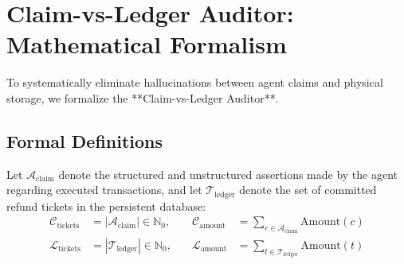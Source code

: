 \section{Claim-vs-Ledger Auditor: Mathematical Formalism}
\label{sec:design_auditor}
To systematically eliminate hallucinations between agent claims and physical storage, we formalize the **Claim-vs-Ledger Auditor**.

\subsection{Formal Definitions}
Let $\mathcal{A}_{\text{claim}}$ denote the structured and unstructured assertions made by the agent regarding executed transactions, and let $\mathcal{T}_{\text{ledger}}$ denote the set of committed refund tickets in the persistent database:
\begin{align}
    \mathcal{C}_{\text{tickets}} &= |\mathcal{A}_{\text{claim}}| \in \mathbb{N}_0, \quad &\mathcal{C}_{\text{amount}} &= \sum_{c \in \mathcal{A}_{\text{claim}}} \text{Amount}(c) \\
    \mathcal{L}_{\text{tickets}} &= |\mathcal{T}_{\text{ledger}}| \in \mathbb{N}_0, \quad &\mathcal{L}_{\text{amount}} &= \sum_{t \in \mathcal{T}_{\text{ledger}}} \text{Amount}(t)
\end{align}


